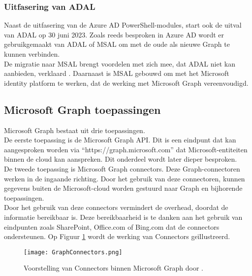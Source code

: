 \subsubsection{Uitfasering van ADAL}

Naast de uitfasering van de Azure \ac{AD} PowerShell-modules, start ook de uitval van \ac{ADAL} op 30 juni 2023. Zoals reeds besproken in Azure \ac{AD} wordt er gebruikgemaakt van \ac{ADAL} of \ac{MSAL} om met de oude als nieuwe Graph te kunnen verbinden. \\

De migratie naar \ac{MSAL} brengt voordelen met zich mee, dat \ac{ADAL} niet kan aanbieden, verklaard \autocite{Microsoft2023m}. Daarnaast is \ac{MSAL} gebouwd om met het Microsoft identity platform te werken, dat de werking met Microsoft Graph vereenvoudigd.



\subsection{Microsoft Graph toepassingen}

Microsoft Graph bestaat uit drie toepassingen. \\

De eerste toepassing is de Microsoft Graph \Ac{API}. Dit is een eindpunt dat kan aangesproken worden via “https://graph.microsoft.com” dat Microsoft-entiteiten binnen de cloud kan aanspreken. Dit onderdeel wordt later dieper besproken. \\

De tweede toepassing is Microsoft Graph connectors. Deze Graph-connectoren werken in de ingaande richting. Door het gebruik van deze connectoren, kunnen gegevens buiten de Microsoft-cloud worden gestuurd naar Graph en bijhorende toepassingen. \\

Door het gebruik van deze connectors vermindert de overhead, doordat de informatie bereikbaar is. Deze bereikbaarheid is te danken aan het gebruik van eindpunten zoals SharePoint, Office.com of Bing.com dat de connectors ondersteunen. Op Figuur \ref{MSGC} wordt de werking van Connectors geïllustreerd. \\

\begin{figure}[!h]
    \texttt{[image: GraphConnectors.png]}
    \caption[Voorbeeld Microsoft Graph Connectors]{Voorstelling van Connectors binnen Microsoft Graph door \textcite{Hay2021}.}
    \label{MSGC}
\end{figure}

